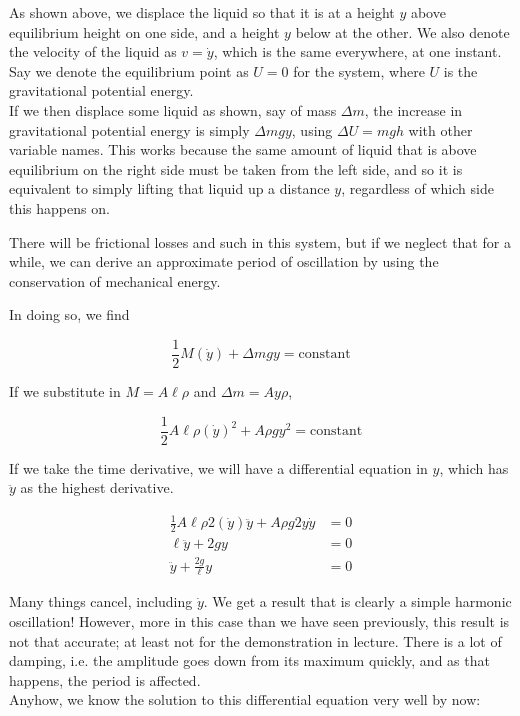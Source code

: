 As shown above, we displace the liquid so that it is at a height $y$ above equilibrium height on one side, and a height $y$ below at the other. We also denote the velocity of the liquid as $v = \dot{y}$, which is the same everywhere, at one instant.\\
Say we denote the equilibrium point as $U = 0$ for the system, where $U$ is the gravitational potential energy.\\
If we then displace some liquid as shown, say of mass $\Delta m$, the increase in gravitational potential energy is simply $\Delta m g y$, using $\Delta U = m g h$ with other variable names. This works because the same amount of liquid that is above equilibrium on the right side must be taken from the left side, and so it is equivalent to simply lifting that liquid up a distance $y$, regardless of which side this happens on.

There will be frictional losses and such in this system, but if we neglect that for a while, we can derive an approximate period of oscillation by using the conservation of mechanical energy.

In doing so, we find

\begin{equation}
\frac{1}{2} M (\dot{y}) + \Delta m g y = \text{constant}
\end{equation}

If we substitute in $M = A \ell \rho$ and $\Delta m = A y \rho$,

\begin{equation}
\frac{1}{2} A \ell \rho (\dot{y})^2 + A \rho g y^2 = \text{constant}
\end{equation}

If we take the time derivative, we will have a differential equation in $y$, which has $\ddot{y}$ as the highest derivative.

\begin{align}
\frac{1}{2} A \ell \rho 2 (\dot{y}) \ddot{y} + A \rho g 2 y \dot{y} &= 0\\
\ell \ddot{y} +  2 g y &= 0\\
\ddot{y} +  \frac{2 g}{\ell} y &= 0
\end{align}

Many things cancel, including $\dot{y}$. We get a result that is clearly a simple harmonic oscillation! However, more in this case than we have seen previously, this result is not that accurate; at least not for the demonstration in lecture. There is a lot of damping, i.e. the amplitude goes down from its maximum quickly, and as that happens, the period is affected.\\
Anyhow, we know the solution to this differential equation very well by now:

